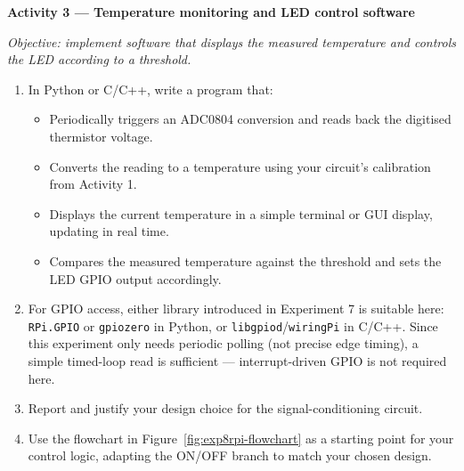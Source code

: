 \begin{procedure}
  \textbf{Activity 3 --- Temperature monitoring and LED control software}\vspace{2pt}

  \textit{Objective: implement software that displays the measured temperature and controls the LED according to a threshold.}

  \begin{enumerate}
    \item In Python or C/C++, write a program that:
          \begin{itemize}
            \item Periodically triggers an ADC0804 conversion and reads back the digitised thermistor voltage.
            \item Converts the reading to a temperature using your circuit's calibration from Activity 1.
            \item Displays the current temperature in a simple terminal or GUI display, updating in real time.
            \item Compares the measured temperature against the threshold and sets the LED GPIO output accordingly.
          \end{itemize}
    \item For GPIO access, either library introduced in Experiment 7 is suitable here: \texttt{RPi.GPIO} or \texttt{gpiozero} in Python, or \texttt{libgpiod}/\texttt{wiringPi} in C/C++. Since this experiment only needs periodic polling (not precise edge timing), a simple timed-loop read is sufficient --- interrupt-driven GPIO is not required here.
    \item Report and justify your design choice for the signal-conditioning circuit.
    \item Use the flowchart in Figure~\ref{fig:exp8rpi-flowchart} as a starting point for your control logic, adapting the ON/OFF branch to match your chosen design.
  \end{enumerate}

  \begin{boxedfigure}
    \centering
\end{boxedfigure}
\end{procedure}
